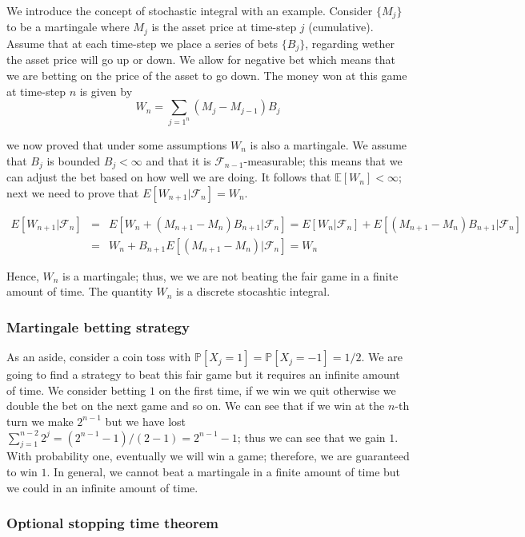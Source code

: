 \documentclass[11pt,a4paper]{article}
\begin{document}
We introduce the concept of stochastic integral with an example.
Consider $\{M_j\}$ to be a martingale where $M_j$ is the asset price at time-step $j$ (cumulative). Assume that at each time-step we place a series of bets $\{B_j\}$, regarding wether the asset price will go up or down. We allow for negative bet which means that we are betting on the price of the asset to go down. The money won at this game at time-step $n$ is given by
\begin{equation}
    W_n = \sum_{j=1^{n}}(M_j-M_{j-1})B_j
\end{equation}

we now proved that under some assumptions $W_n$ is also a martingale. We assume that $B_j$ is bounded $B_j<\infty$ and that it is $\mathcal{F}_{n-1}$-measurable; this means that we can adjust the bet based on how well we are doing. It follows that $\mathbb{E}[W_n]<\infty$; next we need to prove that $E[W_{n+1}|\mathcal{F}_n] = W_{n}$.

\begin{eqnarray*}
    E[W_{n+1}|\mathcal{F}_n] &=&  E[W_{n}+(M_{n+1}-M_n)B_{n+1}|\mathcal{F}_n] =   E[W_{n}|\mathcal{F}_n]+E[(M_{n+1}-M_n)B_{n+1}|\mathcal{F}_n] \\
    &=& W_n + B_{n+1}E[(M_{n+1}-M_n)|\mathcal{F}_n] = W_n
\end{eqnarray*}

Hence, $W_n$ is a martingale; thus, we we are not beating the fair game in a finite amount of time. The quantity $W_n$ is a discrete stocashtic integral. 
\subsubsection{Martingale betting strategy}
As an aside, consider a coin toss with $\mathbb{P}[X_j = 1] = \mathbb{P}[X_j = -1] = 1/2$. We are going to find a strategy to beat this fair game but it requires an infinite amount of time. We consider betting $1$ on the first time, if we win we quit otherwise we double the bet on the next game and so on. We can see that if we win at the $n$-th turn we make $2^{n-1}$ but we have lost $\sum_{j=1}^{n-2}2^j = (2^{n-1}-1)/(2-1) = 2^{n-1}-1$; thus we can see that we gain $1$. With probability one, eventually we will win a game; therefore, we are guaranteed to win $1$. In general, we cannot beat a martingale in a finite amount of time but we could in an infinite amount of time.

\subsubsection{Optional stopping time theorem}
\end{document}

